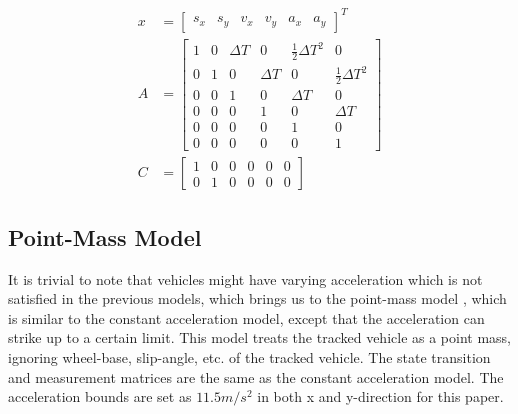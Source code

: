 \begin{equation}
\label{formula:camodel}
\begin{split}
x&= \left[\begin{matrix}
s_x & s_y & v_x & v_y & a_x & a_y
\end{matrix}\right]^{T}\\
A&= \left[\begin{matrix}
1 & 0 & \Delta T & 0 & \frac{1}{2}\Delta T^2 & 0\\
0 & 1 & 0 & \Delta T & 0 & \frac{1}{2}\Delta T^2 \\
0 & 0 & 1 & 0 & \Delta T & 0\\
0 & 0 & 0 & 1 & 0 & \Delta T\\
0 & 0 & 0 & 0 & 1 & 0\\
0 & 0 & 0 & 0 & 0 & 1
\end{matrix}\right] \\
C&= \left[\begin{matrix}
1 & 0 & 0 & 0 & 0 & 0\\
0 & 1 & 0 & 0 & 0 & 0
\end{matrix}\right]
\end{split}
\end{equation}

\subsection{Point-Mass Model}
It is trivial to note that vehicles might have varying acceleration which is not satisfied in the previous models, which brings us to the point-mass model \cite{Althoff}, which is similar to the constant acceleration model, except that the acceleration can strike up to a certain limit. This model treats the tracked vehicle as a point mass, ignoring wheel-base, slip-angle, etc. of the tracked vehicle. The state transition and measurement matrices are the same as the constant acceleration model. The acceleration bounds are set as $11.5 m/s^2$ in both x and y-direction for this paper.

